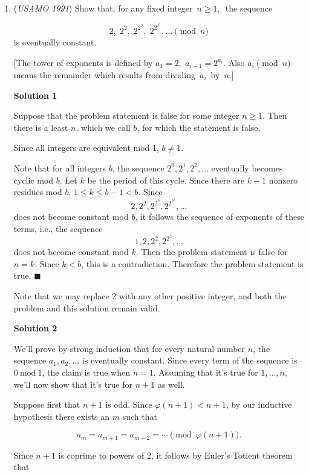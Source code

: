 \begin{enumerate}
	\item (\textit{USAMO 1991}) Show that, for any fixed integer $\,n \geq 1,\,$ the sequence

 \[2, \; 2^2, \; 2^{2^2}, \; 2^{2^{2^2}}, \ldots  \pmod{n}\]
is eventually constant. 


 [The tower of exponents is defined by $a_1 = 2, \; a_{i+1} = 2^{a_i}$. Also $a_i \pmod{n}$ means the remainder which results from dividing $\,a_i\,$ by $\,n$.]


 



\textbf{Solution 1}

Suppose that the problem statement is false for some integer $n \ge 1$.  Then there is a least $n$, which we call $b$, for which the statement is false.

 Since all integers are equivalent mod 1, $b\neq 1$.

 Note that for all integers $b$, the sequence $2^0, 2^1, 2^2, \dotsc$ eventually becomes cyclic mod $b$.  Let $k$ be the period of this cycle.  Since there are $k-1$ nonzero residues mod $b$. $1 \le k\le b-1 < b$.  Since
 \[2, 2^2, 2^{2^2}, 2^{2^{2^2}}, \dotsc\]does not become constant mod $b$, it follows the sequence of exponents of these terms, i.e., the sequence
 \[1, 2, 2^2, 2^{2^{2}}, \dotsc\]does not become constant mod $k$.  Then the problem statement is false for $n=k$.  Since $k<b$, this is a contradiction.  Therefore the problem statement is true.  $\blacksquare$

 Note that we may replace 2 with any other positive integer, and both the problem and this solution remain valid.

 



\textbf{Solution 2}

We’ll prove by strong induction that for every natural number $n$, the sequence $a_1, a_2, \ldots$ is eventually constant. Since every term of the sequence is $0 \mathrm{\ mod\ } 1$, the claim is true when $n = 1$. Assuming that it’s true for $1, \ldots, n$, we’ll now show that it’s true for $n + 1$ as well.

 Suppose first that $n + 1$ is odd. Since $\varphi(n + 1) < n + 1$, by our inductive hypothesis there exists an $m$ such that

 
 \[a_m = a_{m + 1} = a_{m + 2} = \cdots \pmod{\varphi(n + 1)}.\]

 Since $n + 1$ is coprime to powers of $2$, it follows by Euler’s Totient theorem that 


\end{enumerate}
